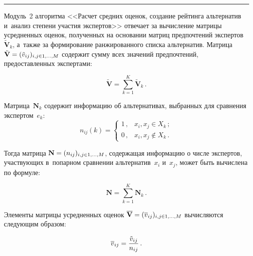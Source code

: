 \begin{multicols}{2}
\begin{center}
{  \vspace*{6pt}
  
  \hrule
}
\end{center}

\smallskip

Модуль~2 алгоритма <<Расчет средних оценок, создание рейтинга альтернатив 
и~анализ степени участия экспертов>> отвечает за вычисление матрицы 
усредненных оценок, полученных на основании матриц предпочтений 
экспертов~$\tilde{\mathbf{V}}_k$, а~также за формирование ранжированного 
списка альтернатив. Матрица $\tilde{\mathbf{V}}\hm= (\tilde{v}_{ij})_{i,j\in 
1,\ldots, M}$ содержит сумму всех значений предпочтений, предоставленных 
экспертами:

\noindent
\begin{equation}
\tilde{\mathbf{V}}=\sum\limits^K_{k=1} \tilde{\mathbf{V}}_k\,.
\label{e9-gai}
\end{equation}
  
  Матрица~$\mathbf{N}_k$ содержит информацию об альтернативах, 
выбранных для сравнения экспертом~$e_k$:
  \begin{equation}
  n_{ij}(k)=\begin{cases}
  1\,, & x_i, x_j\in X_k\,;\\
  0\,, & x_i, x_j\not\in X_k\,.
  \end{cases}
  \label{e10-gai}
  \end{equation}
  
  Тогда матрица $\mathbf{N}\hm= (n_{ij})_{i,j\in 1,\ldots , M}$, содержащая 
информацию о числе экспертов, участвующих в~попарном сравнении 
альтернатив~$x_i$ и~$x_j$, может быть вычислена по формуле:

\noindent
  \begin{equation}
  \mathbf{N}=\sum\limits^K_{k=1} \mathbf{N}_k\,.
  \label{e11-gai}
  \end{equation}
  
  Элементы матрицы усредненных оценок $\overline{\mathbf{V}} \hm= 
(\overline{v}_{ij})_{i,j\in 1,\ldots ,M}$ вычисляются следующим образом:

\vspace*{2pt}

\noindent
  \begin{equation}
  \overline{v}_{ij} = \displaystyle\frac{\displaystyle \tilde{v}_{ij}\mathstrut}{\displaystyle n_{ij}\mathstrut}\,.
  \label{e12-gai}
  \end{equation}
  
  \vspace*{-2pt}
  

\end{multicols}
